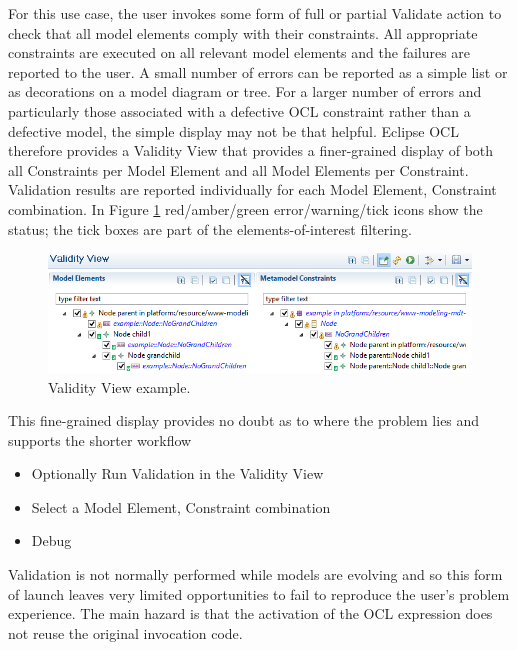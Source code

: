 \documentclass[a4paper]{article}
\begin{document}
For this use case, the user invokes some form of full or partial Validate action to check that all model elements comply with their constraints. All appropriate constraints are executed on all relevant model elements and the failures are reported to the user. A small number of errors can be reported as a simple list or as decorations on a model diagram or tree. For a larger number of errors and particularly those associated with a defective OCL constraint rather than a defective model, the simple display may not be that helpful. Eclipse OCL therefore provides a Validity View that provides a finer-grained display of both all Constraints per Model Element and all Model Elements per Constraint. Validation results are reported individually for each Model Element, Constraint combination. In Figure \ref{fig:ValidityView} red/amber/green error/warning/tick icons show the status; the tick boxes are part of the elements-of-interest filtering.

\begin{figure}
  \begin{center}
    \includegraphics[width=6.75in]{ValidityView.png}
  \end{center}
  \caption{Validity View example.}
  \label{fig:ValidityView}
\end{figure}

This fine-grained display provides no doubt as to where the problem lies and supports the shorter workflow

\begin{itemize}
\item Optionally Run Validation in the Validity View
\item Select a Model Element, Constraint combination
\item Debug
\end{itemize}

Validation is not normally performed while models are evolving and so this form of launch leaves very limited opportunities to fail to reproduce the user's problem experience. The main hazard is that the activation of the OCL expression does not reuse the original invocation code.
\end{document}
